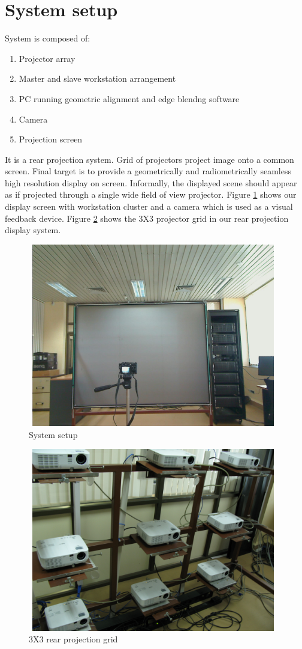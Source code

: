\documentclass{article}
\begin{document}
\section{System setup}
System is composed of:
\begin{enumerate}
\item Projector array
\item Master and slave workstation arrangement
\item PC running geometric alignment and edge blendng software
\item Camera
\item Projection screen
\end{enumerate}
    It is a rear projection system. Grid of projectors project image onto a common screen. Final target is to provide a geometrically and radiometrically seamless high resolution display on screen. Informally, the displayed scene should appear as if projected through a single wide field of view projector. Figure \ref{setup} shows our display screen with workstation cluster and a camera which is used as a visual feedback device. Figure \ref{projs} shows the 3X3 projector grid in our rear projection display system.
\begin{figure}[ht]
\includegraphics[width=11cm,height=8cm]{figures/setup.jpg}
\caption{System setup}
\label{setup}
\end{figure}

\begin{figure}
\includegraphics[width=11cm,height=8cm]{figures/projs.jpg}
\caption{3X3 rear projection grid}
\label{projs}
\end{figure}
\end{document}
